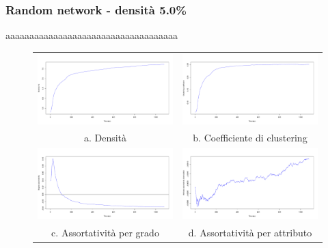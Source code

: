 \documentclass[a4paper,12pt]{article}
\begin{document}
\subsubsection{Random network - densità 5.0\%}
aaaaaaaaaaaaaaaaaaaaaaaaaaaaaaaaaaaa
\begin{figure}[h]
\begin{tabular}{cc}
  \includegraphics[width=81mm]{images/evolution_1000_rnd_1080_5_0.pdf} &   \includegraphics[width=81mm]{images/clustering_1000_rnd_1080_5_0.pdf} \\
a. Densità & b. Coefficiente di clustering \\[6pt]
 \includegraphics[width=81mm]{images/deg_assortativity_1000_rnd_1080_5_0.pdf} &   \includegraphics[width=81mm]{images/homophily_1000_rnd_1080_5_0.pdf} \\
c. Assortatività per grado & d. Assortatività per attributo \\[6pt]
\end{tabular}
\end{figure}
\end{document}
